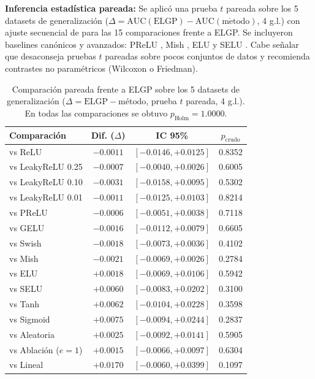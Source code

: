\documentclass[10pt,twocolumn,letterpaper]{article}
\begin{document}
\textbf{Inferencia estadística pareada:} Se aplicó una prueba $t$ pareada sobre los 5 datasets de generalización ($\Delta = \mathrm{AUC}(\mathrm{ELGP}) - \mathrm{AUC}(\mathrm{m\acute{e}todo})$, 4 g.l.) con ajuste secuencial de \citet{holm1979} para las 15 comparaciones frente a ELGP. Se incluyeron baselines canónicos y avanzados: PReLU \citep{he2015prelu}, Mish \citep{misra2019mish}, ELU \citep{clevert2016elu} y SELU \citep{klambauer2017selu}. Cabe señalar que \citet{demsar2006} desaconseja pruebas $t$ pareadas sobre pocos conjuntos de datos y recomienda contrastes no paramétricos (Wilcoxon o Friedman).

\begin{table}[!htbp]
\centering
\footnotesize
\setlength{\tabcolsep}{3.5pt}
\caption{Comparación pareada frente a ELGP sobre los 5 datasets de generalización ($\Delta = \text{ELGP} - \text{método}$, prueba $t$ pareada, 4 g.l.). En todas las comparaciones se obtuvo $p_{\mathrm{Holm}} = 1.0000$.}
\label{tab:estadistica}
\begin{tabularx}{\columnwidth}{@{}>{\raggedright\arraybackslash}Xccc@{}}
\toprule
Comparación & Dif. ($\Delta$) & IC 95\% & $p_{\mathrm{crudo}}$ \\
\midrule
vs ReLU             & $-0.0011$ & $[-0.0146, +0.0125]$ & 0.8352 \\
vs LeakyReLU 0.25   & $-0.0007$ & $[-0.0040, +0.0026]$ & 0.6005 \\
vs LeakyReLU 0.10   & $-0.0031$ & $[-0.0158, +0.0095]$ & 0.5302 \\
vs LeakyReLU 0.01   & $-0.0011$ & $[-0.0125, +0.0103]$ & 0.8214 \\
vs PReLU            & $-0.0006$ & $[-0.0051, +0.0038]$ & 0.7118 \\
vs GELU             & $-0.0016$ & $[-0.0112, +0.0079]$ & 0.6605 \\
vs Swish            & $-0.0018$ & $[-0.0073, +0.0036]$ & 0.4102 \\
vs Mish             & $-0.0021$ & $[-0.0069, +0.0026]$ & 0.2784 \\
vs ELU              & $+0.0018$ & $[-0.0069, +0.0106]$ & 0.5942 \\
vs SELU             & $+0.0060$ & $[-0.0083, +0.0202]$ & 0.3100 \\
vs Tanh             & $+0.0062$ & $[-0.0104, +0.0228]$ & 0.3598 \\
vs Sigmoid          & $+0.0075$ & $[-0.0094, +0.0244]$ & 0.2837 \\
vs Aleatoria        & $+0.0025$ & $[-0.0092, +0.0141]$ & 0.5905 \\
vs Ablación ($e=1$) & $+0.0015$ & $[-0.0066, +0.0097]$ & 0.6304 \\
vs Lineal           & $+0.0170$ & $[-0.0060, +0.0399]$ & 0.1097 \\
\bottomrule
\end{tabularx}
\end{table}
\end{document}
